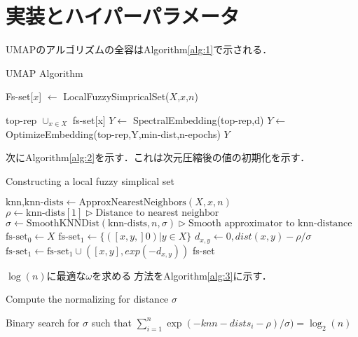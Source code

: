 \documentclass{jsarticle}
\begin{document}
\section{実装とハイパーパラメータ}
UMAPのアルゴリズムの全容はAlgorithm\ref{alg:1}で示される．
\begin{algorithm}
  \caption{UMAP Algorithm}
  \label{alg:1}
  \begin{algorithmic}

      \State Fs-set[$x$] $\leftarrow$ LocalFuzzySimpricalSet($X$,$x$,$n$)

      \EndFor
    \State top-rep \leftarrow $\cup_{x \in X}$ fs-set[x]
    \State $Y \leftarrow$ SpectralEmbedding(top-rep,d)
    \State $Y \leftarrow$ OptimizeEmbedding(top-rep,Y,min-dist,n-epochs)
    \State \Return $Y$
    \EndFunction
  \end{algorithmic}
\end{algorithm}

次にAlgorithm\ref{alg:2}を示す．これは次元圧縮後の値の初期化を示す．
\begin{algorithm}
  \caption{Constructing a local fuzzy simplical set}
  \label{alg:2}
  \begin{algorithmic}
      \State $\text{knn,knn-dists} \leftarrow \text{ApproxNearestNeighbors}(X,x,n)$
      \State $\rho \leftarrow \text{knn-dists}[1] \rhd \text{Distance to nearest neighbor}$ 
      \State $\sigma \leftarrow \text{SmoothKNNDist}(\text{knn-dists},n,\sigma) \rhd \text{Smooth approximator to knn-distance}$
      \State $\text{fs-set}_0 \leftarrow X$
      \State $\text{fs-set}_1 \leftarrow \{([x,y,]0) | y \in X \}$
        \State $d_{x,y} \leftarrow{0,dist(x,y)-\rho}/\sigma$
        \State $\text{fs-set}_1 \leftarrow \text{fs-set}_1 \cup ([x,y],exp(-d_{x,y}))$ 
      \EndFor
      \State \Return fs-set
  \end{algorithmic}
\end{algorithm}

$\log(n)$に最適な$\omega$を求める方法をAlgorithm\ref{alg:3}に示す．
\begin{algorithm}
  \caption{Compute the normalizing for distance $\sigma$}
  \label{alg:3}
  \begin{algorithmic}
    \State Binary search for $\sigma$ such that $\sum_{i=1}^n \exp (-knn-dists_i - \rho)/\sigma)=\log_2(n)$
    \State \Return \sigma
  \end{algorithmic}
\end{algorithm}
\end{document}
